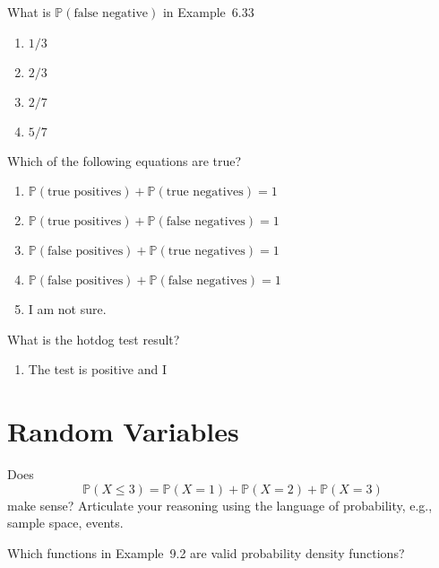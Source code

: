 \documentclass[t, 14pt]{beamer}
\begin{document}
\begin{frame}
  What is \(\mathbb{P}(\text{false negative})\) in Example~6.33

  \begin{enumerate}
    \item \(1/3\)
    \item \(2/3\)
    \item \(2/7\)
    \item \(5/7\)
  \end{enumerate}
\end{frame}

\begin{frame}
  Which of the following equations are true?

  \begin{enumerate}
    \item \(\mathbb{P}(\text{true positives}) + \mathbb{P}(\text{true negatives}) = 1\)
    \item \(\mathbb{P}(\text{true positives}) + \mathbb{P}(\text{false negatives}) = 1\)
    \item \(\mathbb{P}(\text{false positives}) + \mathbb{P}(\text{true negatives}) = 1\)
    \item \(\mathbb{P}(\text{false positives}) + \mathbb{P}(\text{false negatives}) = 1\)
    \item I am not sure. 
  \end{enumerate}
\end{frame}

\begin{frame}
  What is the hotdog test result?

  \begin{enumerate}
    \item The test is positive and I 
  \end{enumerate}
\end{frame}

\section{Random Variables}
\begin{frame}[c]
  Does \[\mathbb{P}(X \le 3) = \mathbb{P}(X = 1) + \mathbb{P}(X = 2) + \mathbb{P}(X = 3)\] make sense?
  Articulate your reasoning using the language of probability, e.g., sample space, events.
\end{frame}

\begin{frame}[c]
  Which functions in Example~9.2 are valid probability density functions?
\end{frame}
\end{document}
